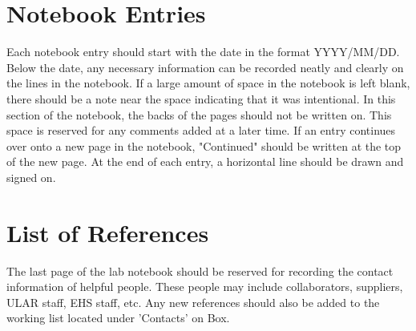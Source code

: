 \documentclass[11pt, oneside]{article}   	%
\begin{document}

\section{Notebook Entries}

Each notebook entry should start with the date in the format YYYY/MM/DD. Below the date, any necessary information can be recorded neatly and clearly on the lines in the notebook. If a large amount of space in the notebook is left blank, there should be a note near the space indicating that it was intentional. In this section of the notebook, the backs of the pages should not be written on. This space is reserved for any comments added at a later time. If an entry continues over onto a new page in the notebook, "Continued" should be written at the top of the new page. At the end of each entry, a horizontal line should be drawn and signed on. 


\section{List of References}

The last page of the lab notebook should be reserved for recording the contact information of helpful people. These people may include collaborators, suppliers, ULAR staff, EHS staff, etc. Any new references should also be added to the working list located under 'Contacts' on Box.


\end{document}
